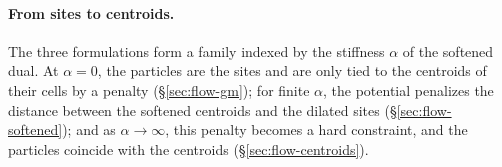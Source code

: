 \documentclass[main.tex]{subfiles}
\begin{document}
\paragraph{From sites to centroids.}
The three formulations form a family indexed by the stiffness $\alpha$ of the softened dual.
At $\alpha \!=\! 0$, the particles are the sites and are only tied to the centroids of their cells by a penalty (\S\ref{sec:flow-gm}); for finite $\alpha$, the potential penalizes the distance between the softened centroids and the dilated sites (\S\ref{sec:flow-softened}); and as $\alpha \!\to\! \infty$, this penalty becomes a hard constraint, and the particles coincide with the centroids (\S\ref{sec:flow-centroids}).
\end{document}

